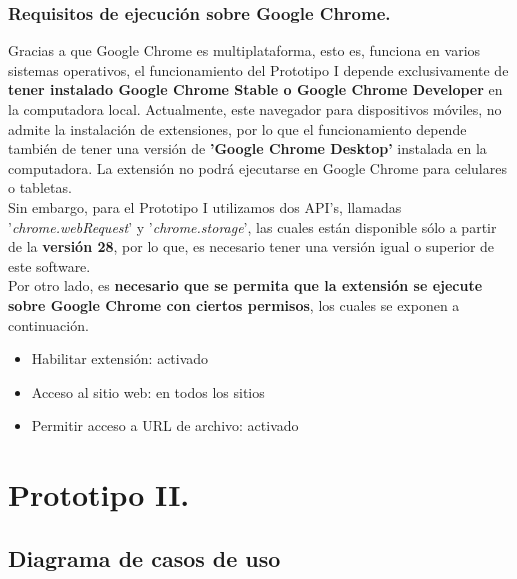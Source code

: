 \documentclass[12pt, a4paper, titlepage]{report}
\begin{document}
			   \subsubsection{Requisitos de ejecución sobre Google Chrome.}
			   Gracias a que Google Chrome es multiplataforma, esto es, funciona en varios sistemas operativos, el funcionamiento del Prototipo I depende exclusivamente de \textbf{tener instalado Google Chrome Stable o Google Chrome Developer} en la computadora local. Actualmente, este navegador para dispositivos móviles, no admite la instalación de extensiones, por lo que el funcionamiento depende también de tener una versión de \textbf{'Google Chrome Desktop'} instalada en la computadora. La extensión no podrá ejecutarse en Google Chrome para celulares o tabletas.\\
			   Sin embargo, para el Prototipo I utilizamos dos API's, llamadas \\ '\textit{chrome.webRequest}' y '\textit{chrome.storage}', las cuales están disponible sólo a partir de la\textbf{ versión 28}, por lo que, es necesario tener una versión igual o superior de este software.\\
			   Por otro lado, es \textbf{necesario que se permita que la extensión se ejecute sobre Google Chrome con ciertos permisos}, los cuales se exponen a continuación.
			   \begin{itemize}
			       \item Habilitar extensión: activado
			       \item Acceso al sitio web: en todos los sitios
			       \item Permitir acceso a URL de archivo: activado
			   \end{itemize}
			   
	    \newpage
			
		\section{Prototipo II.}
			    \subsection{Diagrama de casos de uso}
			    
\end{document}
